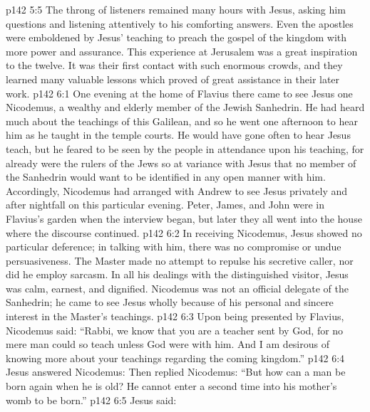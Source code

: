\vs p142 5:5 \pc The throng of listeners remained many hours with Jesus, asking him questions and listening attentively to his comforting answers. Even the apostles were emboldened by Jesus’ teaching to preach the gospel of the kingdom with more power and assurance. This experience at Jerusalem was a great inspiration to the twelve. It was their first contact with such enormous crowds, and they learned many valuable lessons which proved of great assistance in their later work.
\vs p142 6:1 One evening at the home of Flavius there came to see Jesus one Nicodemus, a wealthy and elderly member of the Jewish Sanhedrin. He had heard much about the teachings of this Galilean, and so he went one afternoon to hear him as he taught in the temple courts. He would have gone often to hear Jesus teach, but he feared to be seen by the people in attendance upon his teaching, for already were the rulers of the Jews so at variance with Jesus that no member of the Sanhedrin would want to be identified in any open manner with him. Accordingly, Nicodemus had arranged with Andrew to see Jesus privately and after nightfall on this particular evening. Peter, James, and John were in Flavius’s garden when the interview began, but later they all went into the house where the discourse continued.
\vs p142 6:2 In receiving Nicodemus, Jesus showed no particular deference; in talking with him, there was no compromise or undue persuasiveness. The Master made no attempt to repulse his secretive caller, nor did he employ sarcasm. In all his dealings with the distinguished visitor, Jesus was calm, earnest, and dignified. Nicodemus was not an official delegate of the Sanhedrin; he came to see Jesus wholly because of his personal and sincere interest in the Master’s teachings.
\vs p142 6:3 Upon being presented by Flavius, Nicodemus said: “Rabbi, we know that you are a teacher sent by God, for no mere man could so teach unless God were with him. And I am desirous of knowing more about your teachings regarding the coming kingdom.”
\vs p142 6:4 Jesus answered Nicodemus:  Then replied Nicodemus: “But how can a man be born again when he is old? He cannot enter a second time into his mother’s womb to be born.”
\vs p142 6:5 Jesus said: 
